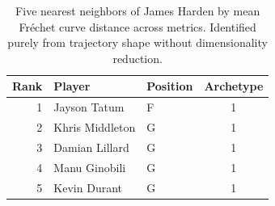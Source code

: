\begin{table}[htbp]
  \centering\small
  \begin{tabular}{rllc}
    \toprule
    Rank & Player & Position & Archetype \\
    \midrule
    1 & Jayson Tatum & F & 1 \\
    2 & Khris Middleton & G & 1 \\
    3 & Damian Lillard & G & 1 \\
    4 & Manu Ginobili & G & 1 \\
    5 & Kevin Durant & G & 1 \\
    \bottomrule
  \end{tabular}
  \caption{Five nearest neighbors of James Harden by mean Fr\'{e}chet curve distance across metrics. Identified purely from trajectory shape without dimensionality reduction.}
  \label{tab:James_Harden_frechet_curve_neighbors}
\end{table}

